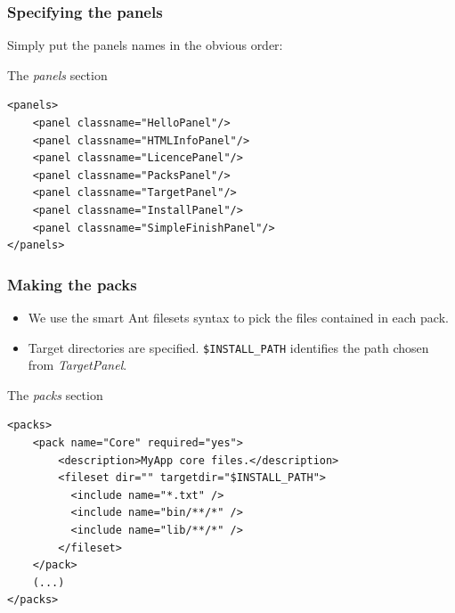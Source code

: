 \documentclass[compress,10pt]{beamer}
\begin{document}

\begin{frame}[containsverbatim]

\frametitle{Specifying the panels}

Simply put the panels names in the obvious order:

\begin{block}{The \textsl{panels} section}
\tiny
\begin{verbatim}
<panels>
    <panel classname="HelloPanel"/>
    <panel classname="HTMLInfoPanel"/>
    <panel classname="LicencePanel"/>
    <panel classname="PacksPanel"/>
    <panel classname="TargetPanel"/>
    <panel classname="InstallPanel"/>
    <panel classname="SimpleFinishPanel"/>
</panels>
\end{verbatim}
\end{block}

\end{frame}


\begin{frame}[containsverbatim]

\frametitle{Making the packs}

\begin{itemize}

  \item We use the smart Ant filesets syntax to pick the files contained in 
  each pack.

  \item Target directories are specified. \alert{\texttt{\small\$INSTALL\_PATH}
  identifies the path chosen from \textsl{TargetPanel}}.

\end{itemize}

\begin{block}{The \textsl{packs} section}
\tiny
\begin{verbatim}
<packs>
    <pack name="Core" required="yes">
        <description>MyApp core files.</description>
        <fileset dir="" targetdir="$INSTALL_PATH">
          <include name="*.txt" />
          <include name="bin/**/*" />
          <include name="lib/**/*" />
        </fileset>
    </pack>
    (...)
</packs>
\end{verbatim}
\end{block}

\end{frame}

\end{document}
